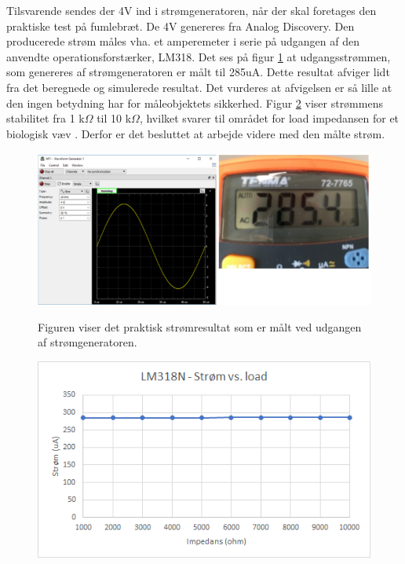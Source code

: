 \pagebreak
Tilsvarende sendes der 4V ind i strømgeneratoren, når der skal foretages den praktiske test på fumlebræt. De 4V genereres fra Analog Discovery. Den producerede strøm måles vha. 
et amperemeter i serie på udgangen af den anvendte operationsforstærker, LM318. Det ses på figur \ref{TestStrGen} at udgangsstrømmen, som genereres af strømgeneratoren er målt til 285uA. Dette resultat afviger lidt fra det beregnede og simulerede resultat. Det vurderes at afvigelsen er så lille at den ingen betydning har for måleobjektets sikkerhed. Figur \ref{fig:Stromgeneratorload} viser strømmens stabilitet fra 1 k$\Omega$ til 10 k$\Omega$, hvilket svarer til området for load impedansen for et biologisk væv \citep{Chester2014}. Derfor er det besluttet at arbejde videre med den målte strøm. 


\begin{figure}[H] 
\centering
{\includegraphics[width=\linewidth]
{Figure/VCCStestParktisk}}
\caption{Figuren viser det praktisk strømresultat som er målt ved udgangen af strømgeneratoren.}
\label{TestStrGen}
\end{figure}

\begin{figure}[H] 
\centering
{\includegraphics[width=12cm]
{Figure/Stromgeneratorload}}
\caption{}
\label{fig:Stromgeneratorload}
\end{figure}

